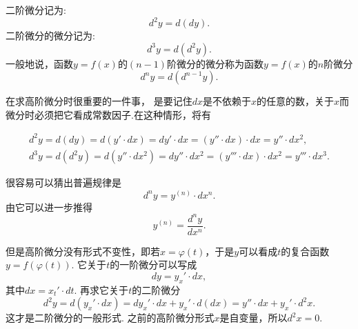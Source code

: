 \documentclass{article}
\begin{document}
二阶微分记为:\[d^2 y =d(dy).\]二阶微分的微分记为:\[d^3 y = d(d^2 y).\]一般地说，函数$y=f(x)$的$(n-1)$阶微分的微分称为函数$y=f(x)$的$n$阶微分\[d^n y  = d(d^{n-1} y).\]

在求高阶微分时很重要的一件事，{\color{red} 是要记住$dx$是不依赖于$x$的任意的数，关于$x$而微分时必须把它看成常数因子}.在这种情形，将有

\begin{align*}
	d^2 y = d(dy) = d(y' \cdot dx) = dy' \cdot dx = (y'' \cdot dx) \cdot dx = y'' \cdot dx^2, \\
	d^3 y = d(d^2 y) = d(y'' \cdot dx^2) =dy'' \cdot dx^2 = (y'''\cdot dx)\cdot dx^2 = y''' \cdot dx^3.
\end{align*}

很容易可以猜出普遍规律是\[d^n y = y^{(n)} \cdot dx^n.\]由它可以进一步推得\[y^{(n)} = \frac{d^n y}{d x^n}.\]

{\color{blue} 但是高阶微分没有形式不变性}，即若$x = \varphi(t)$，于是$y$可以看成$t$的复合函数$y = f(\varphi(t))$. 它关于$t$的一阶微分可以写成\[dy =y_x' \cdot dx,\]其中$dx = x_t' \cdot dt$. 再求它关于$t$的二阶微分\[d^2 y = d(y_x' \cdot dx) = dy_x' \cdot dx + y_x' \cdot d(dx) = y'' \cdot dx + y_x' \cdot d^2 x.\]这才是二阶微分的一般形式. 之前的高阶微分形式$x$是自变量，所以$d^2 x = 0$.
\end{document}
